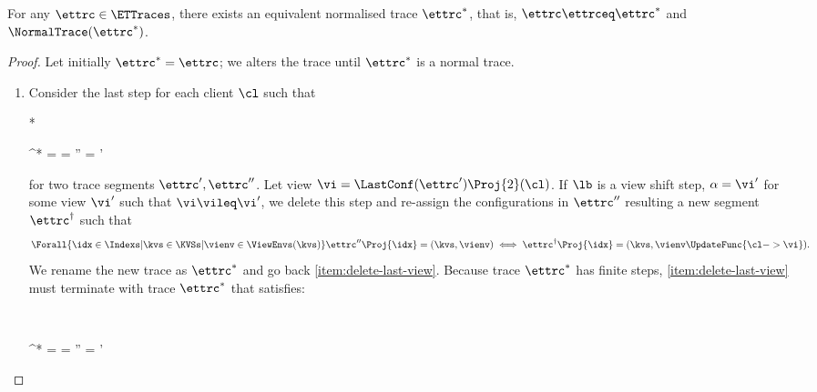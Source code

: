 \begin{toappendix}
\label{sec:proof-equivalent-normal-trace}
\end{toappendix}
\begin{theoremrep}
\label{thm:normal-trace}
For any \( \ettrc \in \ETTraces \), there exists an equivalent normalised trace \( \ettrc^* \),
that is,
\( \ettrc \ettrceq \ettrc^* \) and \( \NormalTrace(\ettrc^*) \).
\end{theoremrep}
\begin{proof}
Let initially \( \ettrc^* = \ettrc \);
we alters the trace until \( \ettrc^*\) is a normal trace.
\begin{enumerate}
\item \label{item:delete-last-view} 
    Consider the last step \lb for each client \( \cl \) such that
    \begin{Formulae}*
    \begin{Formula}
    \ettrc^* =    \land \lb = \lbCl{\alpha} 
    \land {} \ettrc'' = \ToRed{\cdots | \lbCl[\cl']{\stub} -> \cdots } 
    \implies \cl \neq \cl'
    \end{Formula}
    \end{Formulae}
    for two trace segments \( \ettrc',\ettrc'' \).
    Let view \( \vi = \LastConf(\ettrc')\Proj{2}(\cl)\).
    If \( \lb \) is a view shift step,
    \ie \( \alpha = \vi' \) for some view \( \vi' \) such that \( \vi \vileq \vi' \), 
    we delete this step and re-assign the configurations
    in \( \ettrc'' \) resulting a new segment \( \ettrc^\dagger \) such that
    \[
        \Forall{\idx \in \Indexs | \kvs \in \KVSs | \vienv \in \ViewEnvs(\kvs) }  
        \ettrc''\Proj{\idx} = (\kvs,\vienv) \iff \ettrc^\dagger\Proj{\idx} = (\kvs,\vienv\UpdateFunc{ \cl -> \vi}).
    \]
    We rename the new trace as \( \ettrc^* \) and go back \cref{item:delete-last-view}.
    Because trace \( \ettrc^* \)  has finite steps, \cref{item:delete-last-view} must terminate 
    with trace \( \ettrc^* \) that satisfies:
    \begin{Formulae}
    \begin{Formula}
    \\ 
    \begin{Bracketed}
    \ettrc^* =    \land \lb = \lbCl{\alpha} 
    \land \ettrc''  =  \ToRed{\cdots | \lbCl[\cl']{\stub} -> \cdots}
    \implies \cl \neq \cl'
    \end{Bracketed}

\end{Formula}
\end{Formulae}
\end{enumerate}
\end{proof}

